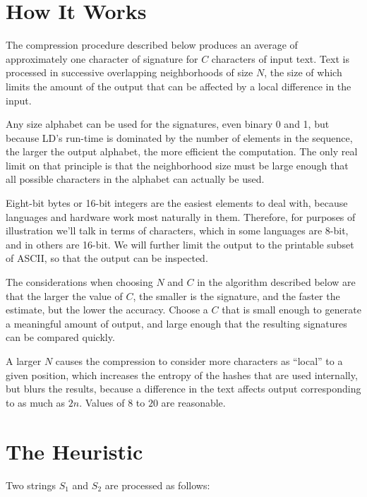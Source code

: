 \documentclass[html]{article}    %
\begin{document}
\section{How It Works} 
The compression procedure described below produces an average of approximately one character of signature
for $C$ characters of input text. 
Text is processed in successive overlapping neighborhoods of size $N$, the size of which limits the amount of the output 
that can be affected by a local difference in the input.  

Any size alphabet can be used for the signatures, even binary 0 and 1, but because LD's run-time is dominated by the number of 
elements in the sequence, the larger the output alphabet, the more efficient the computation.
The only real limit on that principle is that the neighborhood size must be large enough that all possible characters in the
alphabet can actually be used.

Eight-bit bytes or 16-bit integers are the easiest elements to deal with, because languages and hardware work most 
naturally in them. 
Therefore, for purposes of illustration we'll talk in terms of characters, which in some languages are 8-bit, and in others are 16-bit. 
We will further limit the output to the printable subset of ASCII, so that the output can be inspected. 

The considerations when choosing $N$ and $C$ in the algorithm described below are that 
the larger the value of $C$, the smaller is the signature, and the faster the estimate, but the lower the accuracy.
Choose a $C$ that is small enough to generate a meaningful amount of output, and large enough that the resulting signatures
can be compared quickly.

A larger $N$ causes the compression to consider more characters as ``local'' to a given position, which increases the 
entropy of the hashes that are  used internally, but blurs the results, because a difference in the text affects output corresponding
to as much as $2n$.  Values of $8$ to $20$ are reasonable.

\section{The Heuristic}
Two strings $S_{1}$ and $S_{2}$ are processed as follows:
\end{document}
